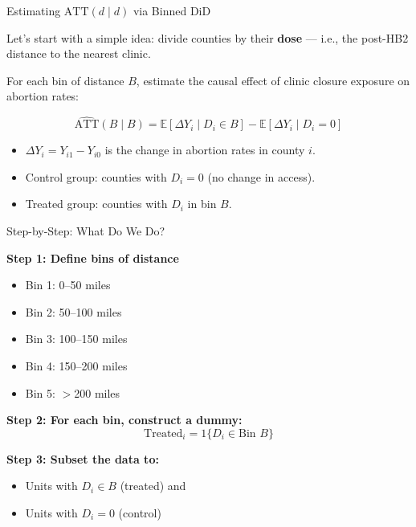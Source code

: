\documentclass{beamer}
\begin{document}
\begin{frame}{Estimating $\text{ATT}(d \mid d)$ via Binned DiD}

Let’s start with a simple idea: divide counties by their \textbf{dose} — i.e., the post-HB2 distance to the nearest clinic.

\bigskip

For each bin of distance $B$, estimate the causal effect of clinic closure exposure on abortion rates:

\[
\widehat{\text{ATT}}(B \mid B) = \mathbb{E}[\Delta Y_i \mid D_i \in B] - \mathbb{E}[\Delta Y_i \mid D_i = 0]
\]

\begin{itemize}
  \item $\Delta Y_i = Y_{i1} - Y_{i0}$ is the change in abortion rates in county $i$.
  \item Control group: counties with $D_i = 0$ (no change in access).
  \item Treated group: counties with $D_i$ in bin $B$.
\end{itemize}

\end{frame}



\begin{frame}{Step-by-Step: What Do We Do?}

\textbf{Step 1: Define bins of distance}

\begin{itemize}
  \item Bin 1: 0–50 miles
  \item Bin 2: 50–100 miles
  \item Bin 3: 100–150 miles
  \item Bin 4: 150–200 miles
  \item Bin 5: $>$200 miles
\end{itemize}

\bigskip

\textbf{Step 2: For each bin, construct a dummy:}
\[
\text{Treated}_i = 1\{D_i \in \text{Bin } B\}
\]

\textbf{Step 3: Subset the data to:}
\begin{itemize}
  \item Units with $D_i \in B$ (treated) and
  \item Units with $D_i = 0$ (control)
\end{itemize}

\end{frame}
\end{document}
